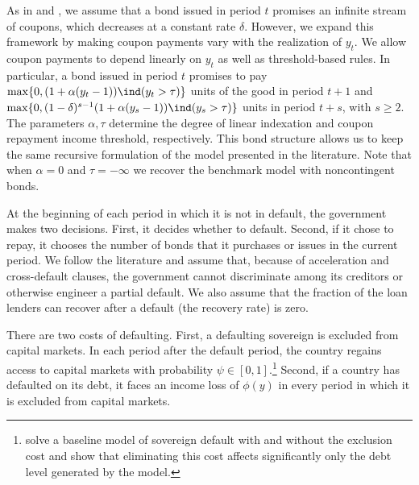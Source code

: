As in \cite{JIE} and \cite{ArellanoRamanarayanan}, we assume that a bond issued in period $t$ promises an infinite stream of coupons, which decreases at a constant rate $\delta$. However, we expand this framework by making coupon payments vary with the realization of $y_t$. We allow coupon payments to depend linearly on $y_t$ as well as threshold-based rules. In particular, a bond issued in period $t$ promises to pay $\max \{0, (1+\alpha(y_t-1)) \ind (y_t > \tau) \}$ units of the good in period $t+1$ and $\max \{0, (1-\delta)^{s-1} (1+\alpha(y_s-1)) \ind (y_s > \tau) \}$ units in period $t+s$, with $s \geq 2$. The parameters ${\alpha, \tau}$ determine the degree of linear indexation and coupon repayment income threshold, respectively. This bond structure allows us to keep the same recursive formulation of the model presented in the literature. Note that when $\alpha=0$ and $\tau=-\infty$ we recover the benchmark model with noncontingent bonds.

At the beginning of each period in which it is not in default, the government makes two decisions. First, it decides whether to default. Second, if it chose to repay, it chooses the number of bonds that it purchases or issues in the current period. We follow the literature and assume that, because of acceleration and cross-default clauses, the government cannot discriminate among its creditors or otherwise engineer a partial default. We also assume that the fraction of the loan lenders can recover after a default (the recovery rate) is zero.

There are two costs of defaulting. First, a defaulting sovereign is excluded from capital markets. In each period after the default
period, the country regains access to capital markets with probability $\psi \in \left[ 0,1\right] $.\footnote{\cite*{EQ_august} solve a baseline
model of sovereign default with and without the exclusion cost and show that eliminating this cost affects significantly only the debt level generated by the model.}  Second, if a country has defaulted on its debt, it faces an income loss of $\phi \left(y\right)$ in every period in which it is excluded from capital markets.  

